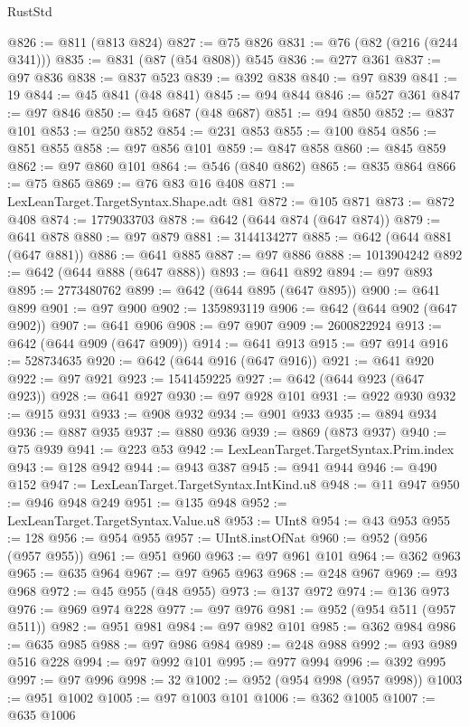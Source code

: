 \begin{lexlean}{RustStd}
\begin{coremodule}
@826 := @811 (@813 @824)
@827 := @75 @826
@831 := @76 (@82 (@216 (@244 @341)))
@835 := @831 (@87 (@54 @808)) @545
@836 := @277 @361
@837 := @97 @836
@838 := @837 @523
@839 := @392 @838
@840 := @97 @839
@841 := 19
@844 := @45 @841 (@48 @841)
@845 := @94 @844
@846 := @527 @361
@847 := @97 @846
@850 := @45 @687 (@48 @687)
@851 := @94 @850
@852 := @837 @101
@853 := @250 @852
@854 := @231 @853
@855 := @100 @854
@856 := @851 @855
@858 := @97 @856 @101
@859 := @847 @858
@860 := @845 @859
@862 := @97 @860 @101
@864 := @546 (@840 @862)
@865 := @835 @864
@866 := @75 @865
@869 := @76 @83 @16 @408
@871 := LexLeanTarget.TargetSyntax.Shape.adt @81
@872 := @105 @871
@873 := @872 @408
@874 := 1779033703
@878 := @642 (@644 @874 (@647 @874))
@879 := @641 @878
@880 := @97 @879
@881 := 3144134277
@885 := @642 (@644 @881 (@647 @881))
@886 := @641 @885
@887 := @97 @886
@888 := 1013904242
@892 := @642 (@644 @888 (@647 @888))
@893 := @641 @892
@894 := @97 @893
@895 := 2773480762
@899 := @642 (@644 @895 (@647 @895))
@900 := @641 @899
@901 := @97 @900
@902 := 1359893119
@906 := @642 (@644 @902 (@647 @902))
@907 := @641 @906
@908 := @97 @907
@909 := 2600822924
@913 := @642 (@644 @909 (@647 @909))
@914 := @641 @913
@915 := @97 @914
@916 := 528734635
@920 := @642 (@644 @916 (@647 @916))
@921 := @641 @920
@922 := @97 @921
@923 := 1541459225
@927 := @642 (@644 @923 (@647 @923))
@928 := @641 @927
@930 := @97 @928 @101
@931 := @922 @930
@932 := @915 @931
@933 := @908 @932
@934 := @901 @933
@935 := @894 @934
@936 := @887 @935
@937 := @880 @936
@939 := @869 (@873 @937)
@940 := @75 @939
@941 := @223 @53
@942 := LexLeanTarget.TargetSyntax.Prim.index
@943 := @128 @942
@944 := @943 @387
@945 := @941 @944
@946 := @490 @152
@947 := LexLeanTarget.TargetSyntax.IntKind.u8
@948 := @11 @947
@950 := @946 @948 @249
@951 := @135 @948
@952 := LexLeanTarget.TargetSyntax.Value.u8
@953 := UInt8
@954 := @43 @953
@955 := 128
@956 := @954 @955
@957 := UInt8.instOfNat
@960 := @952 (@956 (@957 @955))
@961 := @951 @960
@963 := @97 @961 @101
@964 := @362 @963
@965 := @635 @964
@967 := @97 @965 @963
@968 := @248 @967
@969 := @93 @968
@972 := @45 @955 (@48 @955)
@973 := @137 @972
@974 := @136 @973
@976 := @969 @974 @228
@977 := @97 @976
@981 := @952 (@954 @511 (@957 @511))
@982 := @951 @981
@984 := @97 @982 @101
@985 := @362 @984
@986 := @635 @985
@988 := @97 @986 @984
@989 := @248 @988
@992 := @93 @989 @516 @228
@994 := @97 @992 @101
@995 := @977 @994
@996 := @392 @995
@997 := @97 @996
@998 := 32
@1002 := @952 (@954 @998 (@957 @998))
@1003 := @951 @1002
@1005 := @97 @1003 @101
@1006 := @362 @1005
@1007 := @635 @1006

\end{coremodule}
\end{lexlean}
